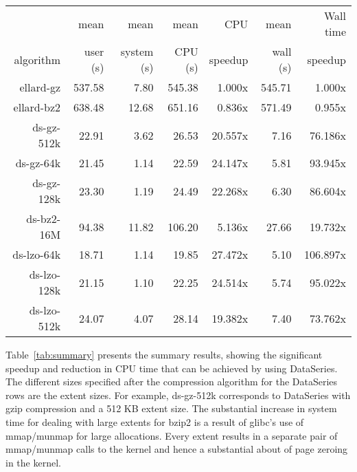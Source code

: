 \documentclass{acm_proc_article-sp}
\begin{document}
 
\begin{table*}
\centering
\begin{tabular}{|r|r|r|r|r|r|r|} \hline
            & mean     & mean       & mean     & CPU     & mean     & Wall time \\
algorithm   & user (s) & system (s) & CPU (s)  & speedup & wall (s) & speedup  \\ \hline
ellard-gz   & 537.58    &  7.80     & 545.38   &  1.000x & 545.71   &   1.000x \\
ellard-bz2  & 638.48    & 12.68     & 651.16   &  0.836x & 571.49   &   0.955x \\
\hline
ds-gz-512k  &  22.91    &  3.62     &  26.53   & 20.557x &   7.16   &  76.186x \\
ds-gz-64k   &  21.45    &  1.14     &  22.59   & 24.147x &   5.81   &  93.945x \\
ds-gz-128k  &  23.30    &  1.19     &  24.49   & 22.268x &   6.30   &  86.604x \\
\hline
ds-bz2-16M  &  94.38    & 11.82     & 106.20   &  5.136x &  27.66   &  19.732x \\
\hline
ds-lzo-64k  &  18.71    &  1.14     &  19.85   & 27.472x &   5.10   & 106.897x \\
ds-lzo-128k &  21.15    &  1.10     &  22.25   & 24.514x &   5.74   &  95.022x \\
ds-lzo-512k &  24.07    &  4.07     &  28.14   & 19.382x &   7.40   &  73.762x \\ \hline
\end{tabular}

\caption{
Summary of performance results for the two analysis programs
operating on a variety of input files.  The analysis was run over the
anon-home04-011118-* files.  For the ellard {\tt nfsscan} program
the text files were compressed with either gz or bz2.  For the
DataSeries {\tt ellardanalysis} program, the DataSeries files were
compressed with either gz, bz2, or lzo, and used various extent sizes
as specified.  CPU and wall time are both relative to ellard-gz.
}

\label{tab:summary}
\end{table*}


Table~\ref{tab:summary} presents the summary results, showing the
significant speedup and reduction in CPU time that can be achieved by
using DataSeries.  The different sizes specified after the compression
algorithm for the DataSeries rows are the extent sizes. 
For example, ds-gz-512k corresponds to DataSeries with gzip
compression and a 512 KB extent size.
The substantial increase in system time for dealing
with large extents for bzip2 is a result of glibc's use of mmap/munmap
for large allocations.  Every extent results in a separate pair of
mmap/munmap calls to the kernel and hence a substantial about of page
zeroing in the kernel.  
\end{document}
